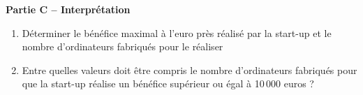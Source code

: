 \documentclass[a4paper,11pt]{article}
\begin{document}
\textbf{\large Partie C -- Interprétation}

\begin{enumerate}
	\item Déterminer le bénéfice maximal à l'euro près réalisé par la start-up et le nombre d'ordinateurs fabriqués pour le réaliser
	\item Entre quelles valeurs doit être compris le nombre d'ordinateurs fabriqués pour que la start-up réalise un bénéfice supérieur ou égal à 10\,000 euros ?
\end{enumerate}
\end{document}
